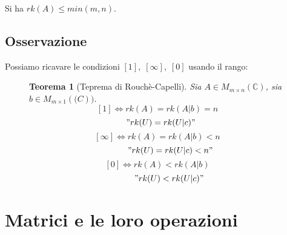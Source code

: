 \documentclass[a4paper]{article}
\newtheorem{theorem}{Teorema}
\theoremstyle{break}
\theoremstyle{break}
\theoremstyle{break}
\theoremstyle{break}
\begin{document}
\noindent Si ha \( rk(A) \le min(m,n) \).

\subsection{Osservazione}
Possiamo ricavare le condizioni \( [1],\;[\infty],\;[0] \) usando il rango:

\begin{figure}[H]
  \begin{theorem}[Teprema di Rouchè-Capelli]
    Sia \( A \in M_{m \times n}(\mathbb{C}) \), sia \( b \in M_{m \times 1}(\mathbb(C)) \).
    \[
      [1] \Leftrightarrow rk(A) = rk(A|b) = n
    \]
    \[
      \hspace{0.3cm} "rk(U) = rk(U|c)"
    \]
    \vspace{0.05cm}
    \[
      [\infty] \Leftrightarrow rk(A) = rk(A|b) < n
    \]
    \[
      \hspace{1.1cm} "rk(U) = rk(U|c) < n"
    \]
    \vspace{0.05cm}
    \[
      [0] \Leftrightarrow rk(A) < rk(A|b)
    \]
    \[
      \hspace{1cm} "rk(U) < rk(U|c)"
    \]
  \end{theorem}
\end{figure}

\section{Matrici e le loro operazioni}
\end{document}
